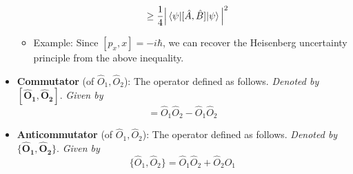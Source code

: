 \documentclass[../notes.tex]{subfiles}
\begin{document}
\begin{itemize}
\begin{itemize}
\begin{align*}
            &\geq \frac{1}{4}\Big| \ev{[\hat{A},\hat{B}]}{\psi} \Big|^2
        \end{align*}
        \item Example: Since $[p_x,x]=-i\hbar$, we can recover the Heisenberg uncertainty principle from the above inequality.
    \end{itemize}
    \item \textbf{Commutator} (of $\hat{O}_1,\hat{O}_2$): The operator defined as follows. \emph{Denoted by} $\bm{[\hat{O}_1,\hat{O}_2]}$. \emph{Given by}
    \begin{equation*}
        [\hat{O}_1,\hat{O}_2] = \hat{O}_1\hat{O}_2-\hat{O}_1\hat{O}_2
    \end{equation*}
    \item \textbf{Anticommutator} (of $\hat{O}_1,\hat{O}_2$): The operator defined as follows. \emph{Denoted by} $\bm{\{\hat{O}_1,\hat{O}_2\}}$. \emph{Given by}
    \begin{equation*}
        \{\hat{O}_1,\hat{O}_2\} = \hat{O}_1\hat{O}_2+\hat{O}_2\hat{O}_1
    \end{equation*}
\end{itemize}
\end{document}
